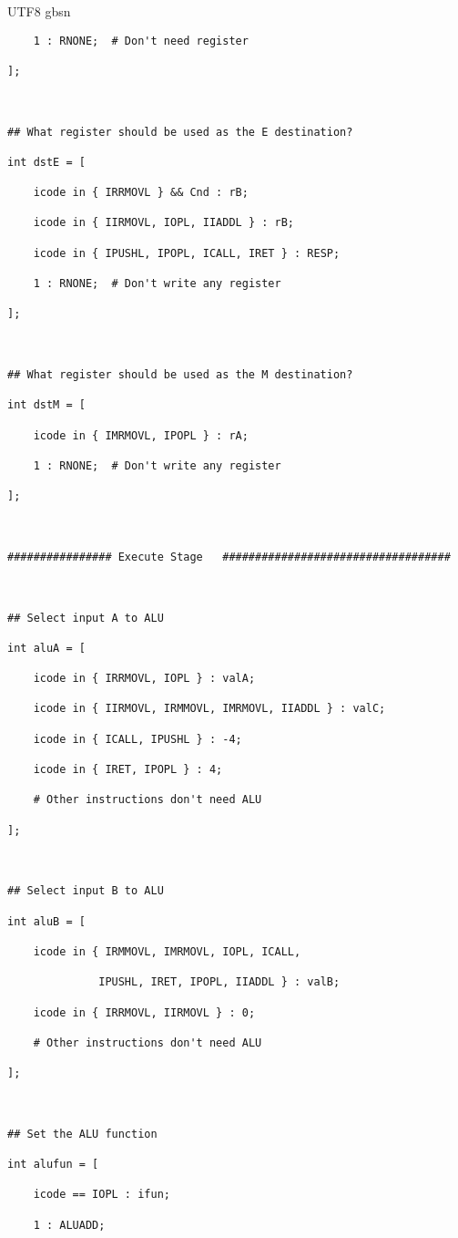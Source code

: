 \documentclass {article}
\begin{document}
\begin {CJK*} {UTF8} {gbsn}
\begin{lstlisting}
	1 : RNONE;  # Don't need register

];



## What register should be used as the E destination?

int dstE = [

	icode in { IRRMOVL } && Cnd : rB;

	icode in { IIRMOVL, IOPL, IIADDL } : rB;

	icode in { IPUSHL, IPOPL, ICALL, IRET } : RESP;

	1 : RNONE;  # Don't write any register

];



## What register should be used as the M destination?

int dstM = [

	icode in { IMRMOVL, IPOPL } : rA;

	1 : RNONE;  # Don't write any register

];



################ Execute Stage   ###################################



## Select input A to ALU

int aluA = [

	icode in { IRRMOVL, IOPL } : valA;

	icode in { IIRMOVL, IRMMOVL, IMRMOVL, IIADDL } : valC;

	icode in { ICALL, IPUSHL } : -4;

	icode in { IRET, IPOPL } : 4;

	# Other instructions don't need ALU

];



## Select input B to ALU

int aluB = [

	icode in { IRMMOVL, IMRMOVL, IOPL, ICALL, 

		      IPUSHL, IRET, IPOPL, IIADDL } : valB;

	icode in { IRRMOVL, IIRMOVL } : 0;

	# Other instructions don't need ALU

];



## Set the ALU function

int alufun = [

	icode == IOPL : ifun;

	1 : ALUADD;


\end{lstlisting}
\end{CJK*}
\end{document}
